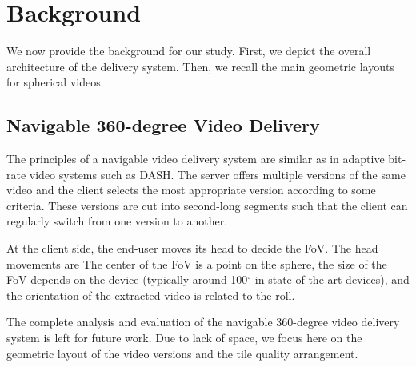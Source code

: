 \section{Background}

We now provide the background for our study.
First, we depict the overall architecture of the delivery system.
Then, we recall the main geometric layouts for spherical videos.

\subsection{Navigable 360-degree Video Delivery}

The principles of a navigable video delivery system are similar as in adaptive bit-rate
video systems such as \ac{DASH}. The server offers multiple versions of the same video
and the client
selects the most appropriate version according to some criteria. These versions
are cut into second-long segments such that the client can regularly switch from one
version to another. 

At the client side, the end-user moves its head to decide the \ac{FoV}. The head movements
are 
 The center of the \ac{FoV} is a
point on the sphere, the size of the \ac{FoV} depends on the device (typically
around 100$^\circ$ in state-of-the-art devices), and the orientation of the extracted video
is related to the roll.

The complete analysis and evaluation of the navigable 360-degree video delivery system
is left for future work. Due to lack of space, we focus here on the geometric layout
of the video versions and the tile quality arrangement.



